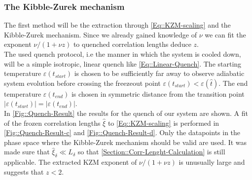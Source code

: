	\subsubsection{The Kibble-Zurek mechanism}
	The first method will be the extraction through \autoref{Eq::KZM-scaling} and the Kibble-Zurek mechanism. Since we already gained knowledge of $\nu$ we can fit the exponent $\nu /	(1 + \nu z)$ to quenched correlation lengths deduce $z$. \\
	
	The used quench protocol, i.e the manner in which the system is cooled down, will be a simple isotropic, linear quench like \autoref{Eq::Linear-Quench}. The starting temperature $\varepsilon(t_{start})$ is chosen to be sufficiently far away to observe adiabatic system evolution before crossing the freezeout point $\varepsilon(t_{start}) < \varepsilon(\hat{t})$. The end temperature $\varepsilon(t_{end})$ is chosen in symmetric distance from the transition point $|\varepsilon(t_{start})|=|\varepsilon(t_{end})|$. \\
	
	In \autoref{Fig::Quench-Result} the results for the quench of our system are shown. A fit of the frozen correlation lengths $\hat{\xi}$ to \autoref{Eq::KZM-scaling} is performed in \autoref{Fig::Quench-Result-c} and \autoref{Fig::Quench-Result-d}. Only the datapoints in the phase space where the Kibble-Zurek mechanism should be valid are used. It was made sure that $\hat{\xi}_\delta \ll L_\delta$ so that \autoref{Section::Corr-Lenght-Calculation} is still applicable. The extracted KZM exponent of $\nu /( 1 + \nu z)$ is unusually large and suggests that $z < 2$. \\
	
